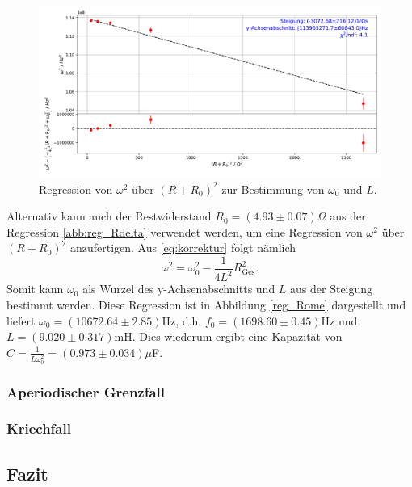 \documentclass[a4paper, 12pt]{scrartcl}
\begin{document}
\begin{figure}[h]
\centering
\includegraphics[width=\textwidth]{plots/reg_Rome.pdf}
\caption{Regression von $\omega^2$ über $(R+R_0)^2$ zur Bestimmung von $\omega_0$ und $L$.}
\label{abb:reg_Rome}
\end{figure}

Alternativ kann auch der Restwiderstand $R_0 = (4.93\pm 0.07)\Omega$ aus der Regression \ref{abb:reg_Rdelta} verwendet werden, um eine Regression von $\omega^2$ über $(R+R_0)^2$ anzufertigen. Aus \ref{eq:korrektur} folgt nämlich
$$\omega^2 = \omega_0^2 - \frac{1}{4L^2} R_{\text{Ges}}^2\text{.}$$
Somit kann $\omega_0$ als Wurzel des y-Achsenabschnitts und $L$ aus der Steigung bestimmt werden. Diese Regression ist in Abbildung \ref{reg_Rome} dargestellt und liefert $\omega_0 = (10672.64\pm 2.85)$Hz, d.h. $f_0 = (1698.60\pm0.45)$Hz und $L = (9.020\pm0.317)$mH. Dies wiederum ergibt eine Kapazität von $C = \frac{1}{L\omega_0^2} = (0.973\pm 0.034)\mu$F.



\subsubsection{Aperiodischer Grenzfall}

\subsubsection{Kriechfall}



\subsection{Fazit}


\newpage




\newpage
\appendix
\end{document}
